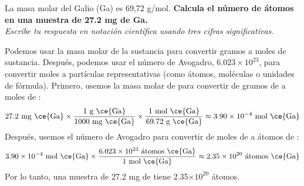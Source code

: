 La masa molar del Galio (Ga) es 69,72 g/mol.
\textbf{Calcula el número de átomos en una muestra de 27.2 mg de Ga.}\\
\emph{Escribe tu respuesta en notación científica usando tres cifras significativas.}

\begin{solutionbox}{6cm}
    Podemos usar la masa molar de la sustancia para convertir gramos a moles de sustancia. Después, podemos usar el número de Avogadro, $6.023 \times 10^{23}$, para convertir moles a  partículas representativas (como átomos, moléculas o unidades de fórmula).
    Primero, usemos la masa molar de  para convertir de gramos de  a moles de :
    \[27.2 \text{ mg \ce{Ga}} \times \frac{1 \text{ g \ce{Ga}}}{1000 \text{ mg \ce{Ga}}} \times \frac{1 \text{ mol \ce{Ga}}}{69.72 \text{ g \ce{Ga}}} \approx 3.90 \times 10^{-4} \text{ mol \ce{Ga}} \]
    Después, usemos el número de Avogadro para convertir de moles de  a átomos de :
    \[3.90 \times 10^{-4} \text{ mol \ce{Ga}} \times \frac{6.023 \times 10^{23} \text{ átomos \ce{Ga}}}{1 \text{ mol \ce{Ga}}} \approx 2.35 \times 10^{20} \text{ átomos \ce{Ga}} \]
    Por lo tanto, una muestra de 27.2 mg de  tiene 2.35$\times 10^{20}$ átomos.
\end{solutionbox}